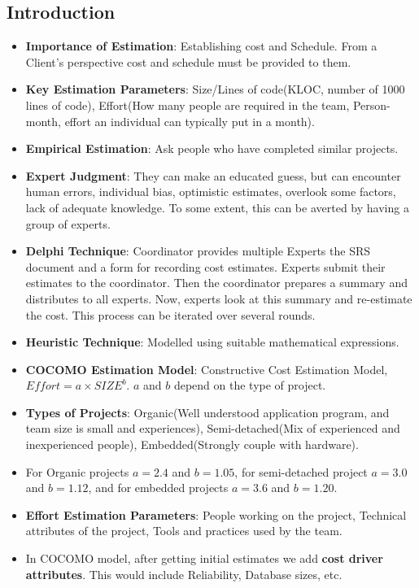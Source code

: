 \documentclass[a4paper]{article}
\begin{document}
\subsection{Introduction}
\begin{itemize}
    \item \textbf{Importance of Estimation}: Establishing cost and Schedule. From a Client's perspective cost and schedule must be provided to them.
    \item \textbf{Key Estimation Parameters}: Size/Lines of code(KLOC, number of 1000 lines of code), Effort(How many people are required in the team, Person-month, effort an individual can typically put in a month).
    \item \textbf{Empirical Estimation}: Ask people who have completed similar projects.
    \item \textbf{Expert Judgment}: They can make an educated guess, but can encounter human errors, individual bias, optimistic estimates, overlook some factors, lack of adequate knowledge. To some extent, this can be averted by having a group of experts.
    \item \textbf{Delphi Technique}: Coordinator provides multiple Experts the SRS document and a form for recording cost estimates. Experts submit their estimates to the coordinator. Then the coordinator prepares a summary and distributes to all experts. Now, experts look at this summary and re-estimate the cost. This process can be iterated over several rounds.
    \item \textbf{Heuristic Technique}: Modelled using suitable mathematical expressions.
    \item \textbf{COCOMO Estimation Model}: Constructive Cost Estimation Model, $Effort=a\times SIZE^b$. $a$ and $b$ depend on the type of project.
    \item \textbf{Types of Projects}: Organic(Well understood application program, and team size is small and experiences), Semi-detached(Mix of experienced and inexperienced people), Embedded(Strongly couple with hardware).
    \item For Organic projects $a=2.4$ and $b=1.05$, for semi-detached project $a=3.0$ and $b=1.12$, and for embedded projects $a=3.6$ and $b=1.20$.
    \item \textbf{Effort Estimation Parameters}: People working on the project, Technical attributes of the project, Tools and practices used by the team.
    \item In COCOMO model, after getting initial estimates we add \textbf{cost driver attributes}. This would include Reliability, Database sizes, etc.

\end{itemize}
\end{document}
